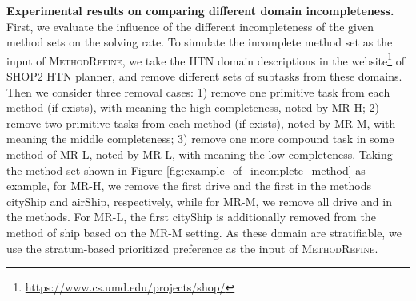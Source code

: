 \documentclass[letterpaper]{article} %
\begin{document}
\textbf{Experimental results on comparing different domain incompleteness.}
First, we evaluate the influence of the different incompleteness of the given method sets on the solving rate.
To simulate the incomplete method set as the input of \textsc{MethodRefine}, we take the HTN domain descriptions in the website\footnote{\url{https://www.cs.umd.edu/projects/shop/}} of SHOP2 HTN planner, and remove different sets of subtasks from these domains. Then we consider three removal cases: 1) remove one primitive task from each method (if exists), with meaning the high completeness, noted by MR-H; 2) remove two primitive tasks from each method (if exists), noted by MR-M, with meaning the middle completeness; 3) remove one more compound task in some method of MR-L, noted by MR-L, with meaning the low completeness.
Taking the method set shown in Figure \ref{fig:example_of_incomplete_method} as example,
for MR-H, we remove the first \textsf{drive} and the first  in the methods \textsf{cityShip} and \textsf{airShip}, respectively,
while for MR-M, we remove all \textsf{drive} and  in the methods.
For MR-L, the first \textsf{cityShip} is additionally removed from the method of \textsf{ship} based on the MR-M setting.
As these domain are stratifiable, we use the stratum-based prioritized preference as the input of \textsc{MethodRefine}.
%
%
\end{document}
